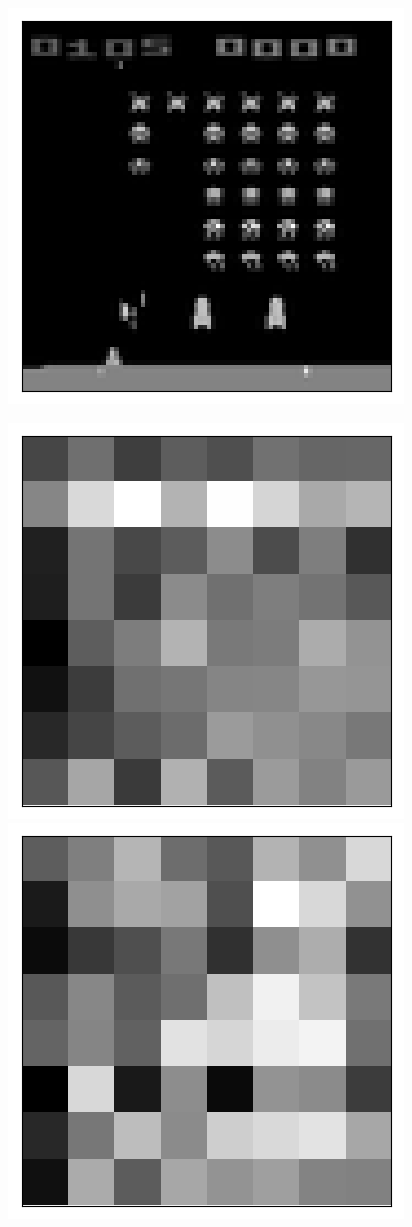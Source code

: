 \begin{figure}[h!]
\begin{multicols}{4}
    \includegraphics[scale=0.4]{figures/results/latent_image/beta_1_sample_90_original.png}
\end{multicols}
\begin{multicols}{4}
    \includegraphics[scale=0.3]{figures/results/latent_image/beta_1_sample_10_latent.png}
    \includegraphics[scale=0.3]{figures/results/latent_image/beta_1_sample_30_latent.png}

\end{multicols}
\end{figure}
